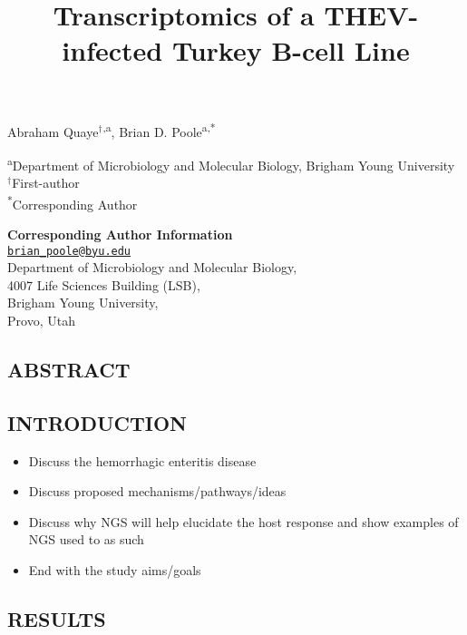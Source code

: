 \documentclass[
]{article}
\title{Transcriptomics of a THEV-infected Turkey B-cell Line}
\author{}
\date{\vspace{-2.5em}}
\providecommand{\tightlist}{%
  \setlength{\itemsep}{0pt}\setlength{\parskip}{0pt}}
\begin{document}
\maketitle

\vspace{5mm}

Abraham Quaye\({^\dagger}\)\textsuperscript{,a}, Brian D.
Poole\textsuperscript{a,*}

\vspace{5mm}

\textsuperscript{a}Department of Microbiology and Molecular Biology,
Brigham Young University\\
\({^\dagger}\)First-author\\
\textsuperscript{*}Corresponding Author

\vspace{5mm}

\textbf{Corresponding Author Information}\\
\href{mailto:brian_poole@byu.edu}{\nolinkurl{brian\_poole@byu.edu}}\\
Department of Microbiology and Molecular Biology,\\
4007 Life Sciences Building (LSB),\\
Brigham Young University,\\
Provo, Utah\\

\newpage

\subsection{ABSTRACT}\label{abstract}

\newpage

\subsection{INTRODUCTION}\label{introduction}

\begin{itemize}
\tightlist
\item
  Discuss the hemorrhagic enteritis disease
\item
  Discuss proposed mechanisms/pathways/ideas
\item
  Discuss why NGS will help elucidate the host response and show
  examples of NGS used to as such
\item
  End with the study aims/goals \newpage
\end{itemize}

\subsection{RESULTS}\label{results}
\end{document}

